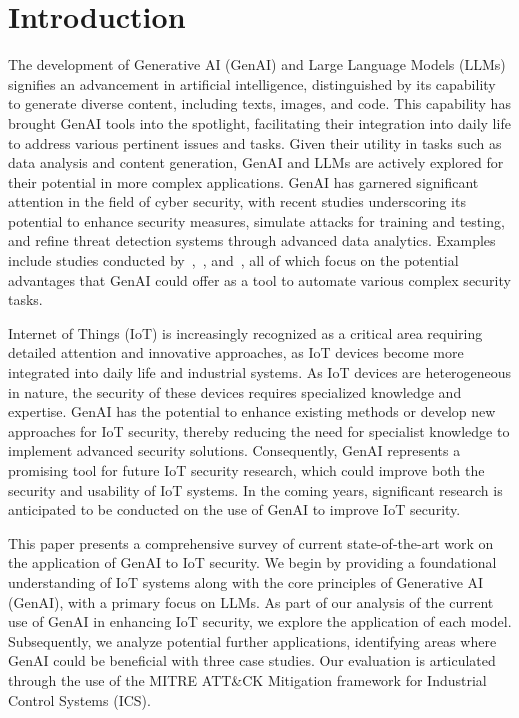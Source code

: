 \section{Introduction}
\label{sec:intro}
%
The development of Generative AI (GenAI) and Large Language Models (LLMs) signifies an advancement in artificial intelligence, distinguished by its capability to generate diverse content, including texts, images, and code.
This capability has brought GenAI tools into the spotlight, facilitating their integration into daily life to address various pertinent issues and tasks.
Given their utility in tasks such as data analysis and content generation, GenAI and LLMs are actively explored for their potential in more complex applications. 
GenAI has garnered significant attention in the field of cyber security, with recent studies underscoring its potential to enhance security measures, simulate attacks for training and testing, and refine threat detection systems through advanced data analytics.
Examples include studies conducted by~\citet{9105926},~\citet{10198233}, and~\citet{hassanin2024comprehensiveoverviewlargelanguage}, all of which focus on the potential advantages that GenAI could offer as a tool to automate various complex security tasks.

Internet of Things (IoT) is increasingly recognized as a critical area requiring detailed attention and innovative approaches, as IoT devices become more integrated into daily life and industrial systems.
As IoT devices are heterogeneous in nature, the security of these devices requires specialized knowledge and expertise.
GenAI has the potential to enhance existing methods or develop new approaches for IoT security, thereby reducing the need for specialist knowledge to implement advanced security solutions.
Consequently, GenAI represents a promising tool for future IoT security research, which could improve both the security and usability of IoT systems.
In the coming years, significant research is anticipated to be conducted on the use of GenAI to improve IoT security.

This paper presents a comprehensive survey of current state-of-the-art work on the application of GenAI to IoT security.
We begin by providing a foundational understanding of IoT systems along with the core principles of Generative AI (GenAI), with a primary focus on LLMs.
As part of our analysis of the current use of GenAI in enhancing IoT security, we explore the application of each model.
Subsequently, we analyze potential further applications, identifying areas where GenAI could be beneficial with three case studies.
Our evaluation is articulated through the use of the MITRE ATT\&CK Mitigation framework for Industrial Control Systems (ICS).
%
